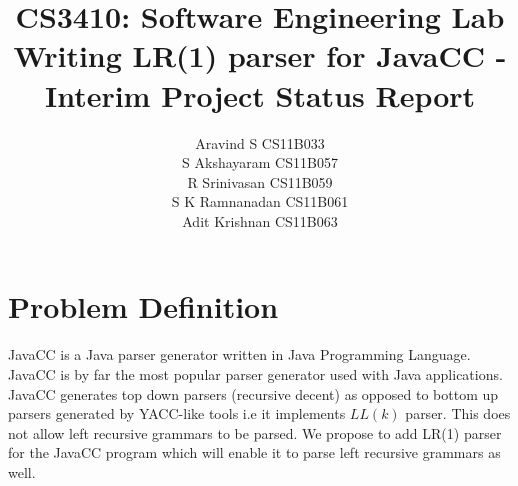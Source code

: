 \documentclass{article}
\begin{document}
\title{\textbf{CS3410: Software Engineering Lab}
\\
\textbf{Writing LR(1) parser for JavaCC - Interim Project Status Report}}
\author{ Aravind S CS11B033 \\
		 S Akshayaram CS11B057\\
		 R Srinivasan CS11B059\\
		 S K Ramnanadan CS11B061\\
		 Adit Krishnan  CS11B063\\
}
\maketitle
\section{Problem Definition}
JavaCC is a Java parser generator written in Java Programming Language. JavaCC is by far the most popular parser generator used with Java applications. JavaCC generates top down parsers (recursive decent) as opposed to bottom up parsers generated by YACC-like tools i.e it implements $LL(k)$ parser. This does not allow left recursive grammars to be parsed. We propose to add LR(1) parser for the JavaCC program which will enable it to parse left recursive grammars as well.
\end{document}
